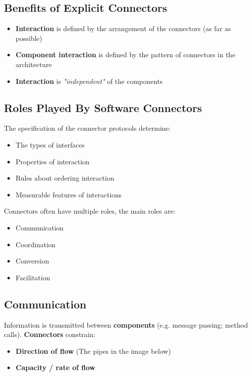 \documentclass[a4paper]{article}
\begin{document}
\subsection{Benefits of Explicit Connectors}
\begin{itemize}
\item \textbf{Interaction} is defined by the arrangement of the connectors (as far as possible)
\item \textbf{Component interaction} is defined by the pattern of connectors in the architecture
\item \textbf{Interaction} is \textit{"independent"} of the components
\end{itemize}

\subsection{Roles Played By Software Connectors}
The specification of the connector protocols determine:
\begin{itemize}
\item The types of interfaces
\item Properties of interaction
\item Rules about ordering interaction
\item Measurable features of interactions\\
\end{itemize}

Connectors often have multiple roles, the main roles are:
\begin{itemize}
\item Communication
\item Coordination
\item Conversion
\item Facilitation
\end{itemize}

\subsection{Communication}
Information is transmitted between \textbf{components} (e.g. message passing; method calls). \textbf{Connectors} constrain:
\begin{itemize}
\item \textbf{Direction of flow }(The pipes in the image below)
\item \textbf{Capacity / rate of flow}\\
\end{itemize}
\end{document}
